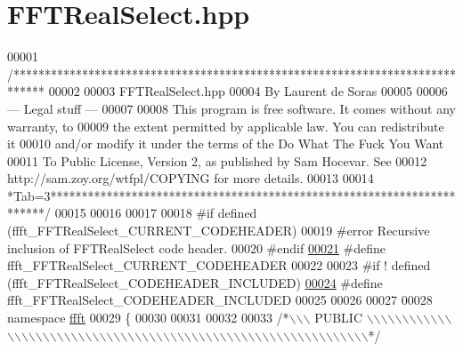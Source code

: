 \hypertarget{a00105_source}{\section{F\+F\+T\+Real\+Select.\+hpp}
\label{a00105_source}
}

\begin{DoxyCode}
00001 \textcolor{comment}{/*****************************************************************************}
00002 \textcolor{comment}{}
00003 \textcolor{comment}{        FFTRealSelect.hpp}
00004 \textcolor{comment}{        By Laurent de Soras}
00005 \textcolor{comment}{}
00006 \textcolor{comment}{--- Legal stuff ---}
00007 \textcolor{comment}{}
00008 \textcolor{comment}{This program is free software. It comes without any warranty, to}
00009 \textcolor{comment}{the extent permitted by applicable law. You can redistribute it}
00010 \textcolor{comment}{and/or modify it under the terms of the Do What The Fuck You Want}
00011 \textcolor{comment}{To Public License, Version 2, as published by Sam Hocevar. See}
00012 \textcolor{comment}{http://sam.zoy.org/wtfpl/COPYING for more details.}
00013 \textcolor{comment}{}
00014 \textcolor{comment}{*Tab=3***********************************************************************/}
00015 
00016 
00017 
00018 \textcolor{preprocessor}{#if defined (ffft\_FFTRealSelect\_CURRENT\_CODEHEADER)}
00019 \textcolor{preprocessor}{    #error Recursive inclusion of FFTRealSelect code header.}
00020 \textcolor{preprocessor}{#endif}
\hypertarget{a00105_source_l00021}{}\hyperlink{a00105_afbb96f675b29fc93ca1201baac6549a6}{00021} \textcolor{preprocessor}{#define ffft\_FFTRealSelect\_CURRENT\_CODEHEADER}
00022 
00023 \textcolor{preprocessor}{#if ! defined (ffft\_FFTRealSelect\_CODEHEADER\_INCLUDED)}
\hypertarget{a00105_source_l00024}{}\hyperlink{a00105_af126899a30fc9910f64861b24cdd2631}{00024} \textcolor{preprocessor}{#define ffft\_FFTRealSelect\_CODEHEADER\_INCLUDED}
00025 
00026 
00027 
00028 \textcolor{keyword}{namespace }\hyperlink{a00142}{ffft}
00029 \{
00030 
00031 
00032 
00033 \textcolor{comment}{/*\(\backslash\)\(\backslash\)\(\backslash\) PUBLIC \(\backslash\)\(\backslash\)\(\backslash\)\(\backslash\)\(\backslash\)\(\backslash\)\(\backslash\)\(\backslash\)\(\backslash\)\(\backslash\)\(\backslash\)\(\backslash\)\(\backslash\)\(\backslash\)\(\backslash\)\(\backslash\)\(\backslash\)\(\backslash\)\(\backslash\)\(\backslash\)\(\backslash\)\(\backslash\)\(\backslash\)\(\backslash\)\(\backslash\)\(\backslash\)\(\backslash\)\(\backslash\)\(\backslash\)\(\backslash\)\(\backslash\)\(\backslash\)\(\backslash\)\(\backslash\)\(\backslash\)\(\backslash\)\(\backslash\)\(\backslash\)\(\backslash\)\(\backslash\)\(\backslash\)\(\backslash\)\(\backslash\)\(\backslash\)\(\backslash\)\(\backslash\)\(\backslash\)\(\backslash\)\(\backslash\)\(\backslash\)\(\backslash\)\(\backslash\)\(\backslash\)\(\backslash\)\(\backslash\)\(\backslash\)\(\backslash\)\(\backslash\)\(\backslash\)\(\backslash\)\(\backslash\)\(\backslash\)\(\backslash\)*/}

\end{DoxyCode}
